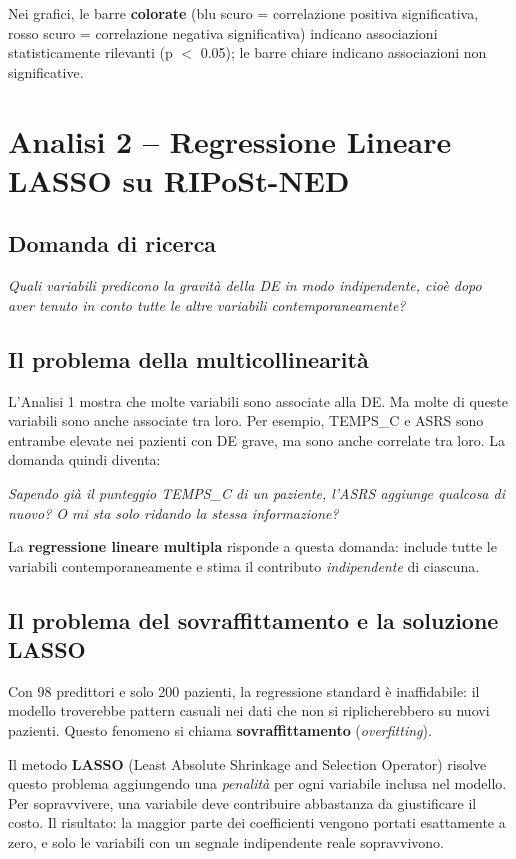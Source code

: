 \documentclass[12pt, a4paper]{article}
\begin{document}
Nei grafici, le barre \textbf{colorate} (blu scuro = correlazione positiva significativa,
rosso scuro = correlazione negativa significativa) indicano associazioni statisticamente
rilevanti (p $<$ 0.05); le barre chiare indicano associazioni non significative.

\section{Analisi 2 -- Regressione Lineare LASSO su RIPoSt-NED}

\subsection{Domanda di ricerca}

\textit{Quali variabili predicono la gravità della DE in modo indipendente, cioè dopo aver
tenuto in conto tutte le altre variabili contemporaneamente?}

\subsection{Il problema della multicollinearità}

L'Analisi 1 mostra che molte variabili sono associate alla DE. Ma molte di queste variabili
sono anche associate tra loro. Per esempio, TEMPS\_C e ASRS sono entrambe elevate nei
pazienti con DE grave, ma sono anche correlate tra loro. La domanda quindi diventa:

\textit{Sapendo già il punteggio TEMPS\_C di un paziente, l'ASRS aggiunge qualcosa di nuovo?
O mi sta solo ridando la stessa informazione?}

La \textbf{regressione lineare multipla} risponde a questa domanda: include tutte le variabili
contemporaneamente e stima il contributo \textit{indipendente} di ciascuna.

\subsection{Il problema del sovraffittamento e la soluzione LASSO}

Con 98 predittori e solo 200 pazienti, la regressione standard è inaffidabile: il modello
troverebbe pattern casuali nei dati che non si riplicherebbero su nuovi pazienti. Questo
fenomeno si chiama \textbf{sovraffittamento} (\textit{overfitting}).

Il metodo \textbf{LASSO} (Least Absolute Shrinkage and Selection Operator) risolve questo
problema aggiungendo una \textit{penalità} per ogni variabile inclusa nel modello. Per
sopravvivere, una variabile deve contribuire abbastanza da giustificare il costo. Il
risultato: la maggior parte dei coefficienti vengono portati esattamente a zero, e solo le
variabili con un segnale indipendente reale sopravvivono.
\end{document}
